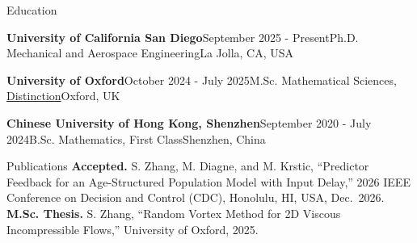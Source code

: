 \documentclass{resume} %
\begin{document}

\begin{rSection}{Education}

    \begin{rSubsectionNoBullet}{\bf University of California San Diego}{September 2025 - Present}{Ph.D. Mechanical and Aerospace Engineering}{La Jolla, CA, USA}
    \end{rSubsectionNoBullet}

    \begin{rSubsectionNoBullet}{\bf University of Oxford}{October 2024 - July 2025}{M.Sc. Mathematical Sciences, \href{https://veri.edocuments.ox.ac.uk/?reference=54337223-01-9WO7}{Distinction}}{Oxford, UK}
    \end{rSubsectionNoBullet}

    \begin{rSubsectionNoBullet}{\bf Chinese University of Hong Kong, Shenzhen}{September 2020 - July 2024}{B.Sc. Mathematics, First Class}{Shenzhen, China}
    \end{rSubsectionNoBullet}

\end{rSection}

\begin{rSection}{Publications}
    \textbf{Accepted.} S. Zhang, M. Diagne, and M. Krstic, ``Predictor Feedback for an Age-Structured Population Model with Input Delay,'' 2026 IEEE Conference on Decision and Control (CDC), Honolulu, HI, USA, Dec.\ 2026.\\[0.35em]
    \textbf{M.Sc. Thesis.} S. Zhang, ``Random Vortex Method for 2D Viscous Incompressible Flows,'' University of Oxford, 2025.
\end{rSection}
\end{document}
